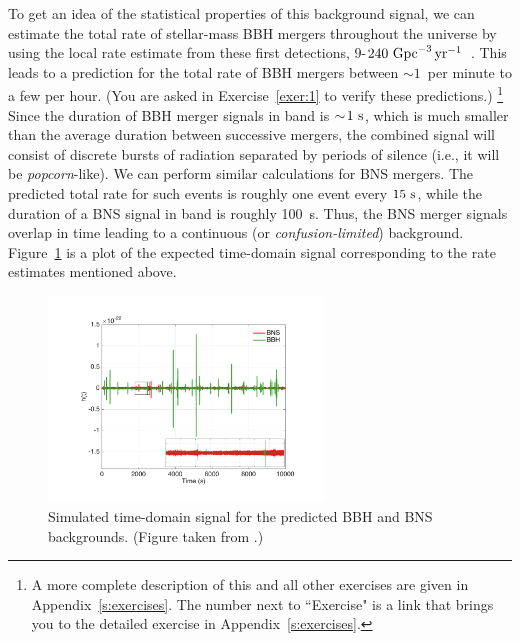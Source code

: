 To get an idea of the statistical properties of this
background signal, we can estimate the total rate of 
stellar-mass BBH mergers throughout the universe by
using the local rate estimate from these first detections,
$9$-$240~{\rm Gpc}^{-3}\,{\rm yr}^{-1}$~\cite{TheLIGOScientific:2016-O1-rates}.
This leads to a prediction for the total rate of 
BBH mergers between $\sim\!1$~per minute to a few per hour.
(You are asked in Exercise~\ref{exer:1} to verify
these predictions.)%
\footnote{A more complete description of this and 
all other exercises are given in 
Appendix~\ref{s:exercises}.
The number next to ``Exercise" is a link that brings 
you to the detailed exercise in Appendix~\ref{s:exercises}.}
Since the duration of BBH merger signals in band 
is $\sim\!1~{\rm s}$, which is much smaller than the 
average duration between successive mergers, the 
combined signal will consist of discrete bursts of 
radiation separated by periods of silence 
(i.e., it will be {\em popcorn}-like).
We can perform similar calculations for BNS mergers.
The predicted total rate for such events is roughly 
one event every $15~{\rm s}$, while the duration of 
a BNS signal in band is roughly 100~{\rm s}. 
Thus, the BNS merger signals overlap in time leading to 
a continuous (or {\em confusion-limited}) background. 
Figure~\ref{f:BBH-BNS-timeseries} is a plot of the
expected time-domain signal corresponding to the rate
estimates mentioned above.
%
\begin{figure}[htbp!]
\begin{center}
\includegraphics[width=0.65\textwidth]{Figures/BBH-BNS-timeseries}
\caption{Simulated time-domain signal for the predicted BBH and 
BNS backgrounds.  
(Figure taken from \cite{StochImplications:2018}.)}
\label{f:BBH-BNS-timeseries}
\end{center}
\end{figure}
%

